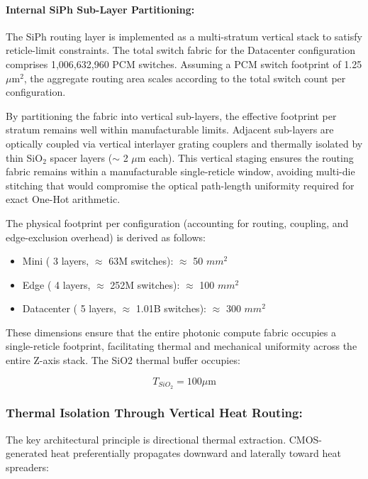 \documentclass[journal]{IEEEtran}
\begin{document}
\paragraph{\textbf{Internal SiPh Sub-Layer Partitioning:}}

The SiPh routing layer is implemented as a multi-stratum vertical stack to satisfy reticle-limit constraints. The total switch fabric for the Datacenter configuration comprises 1,006,632,960 PCM switches. Assuming a PCM switch footprint of 1.25 $\mu$m$^{2}$, the aggregate routing area scales according to the total switch count per configuration.

By partitioning the fabric into vertical sub-layers, the effective footprint per stratum remains well within manufacturable limits. Adjacent sub-layers are optically coupled via vertical interlayer grating couplers and thermally isolated by thin SiO$_2$ spacer layers ($\sim$ 2 $\mu$m each). This vertical staging ensures the routing fabric remains within a manufacturable single-reticle window, avoiding multi-die stitching that would compromise the optical path-length uniformity required for exact One-Hot arithmetic.

The physical footprint per configuration (accounting for routing, coupling, and edge-exclusion overhead) is derived as follows:

\begin{itemize}
\item  Mini ( 3 layers, $\approx$ 63M switches): $\approx$ 50 $mm^{2}$
\item  Edge ( 4 layers, $\approx$ 252M switches): $\approx$ 100 $mm^{2}$
\item  Datacenter ( 5 layers, $\approx$ 1.01B switches): $\approx$ 300 $mm^{2}$
\end{itemize}

These dimensions ensure that the entire photonic compute fabric occupies a single-reticle footprint, facilitating thermal and mechanical uniformity across the entire Z-axis stack. The SiO2 thermal buffer occupies:

\begin{equation}
T_{SiO_2} = 100 \mu\text{m}
\end{equation}

\subsubsection{\textbf{Thermal Isolation Through Vertical Heat Routing:}}

The key architectural principle is directional thermal extraction. CMOS-generated heat preferentially propagates downward and laterally toward heat spreaders:
\end{document}
